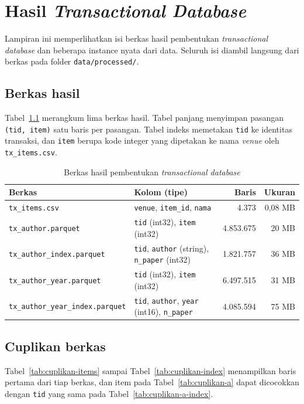 \chapter{Hasil \textit{Transactional Database}}
\label{lamp:transaksi}

Lampiran ini memperlihatkan isi berkas hasil pembentukan \textit{transactional database} dan beberapa instance nyata dari data. Seluruh isi diambil langsung dari berkas pada folder \texttt{data/processed/}.

\section{Berkas hasil}
Tabel~\ref{tab:berkas-tx} merangkum lima berkas hasil. Tabel panjang menyimpan pasangan \texttt{(tid, item)} satu baris per pasangan. Tabel indeks memetakan \texttt{tid} ke identitas transaksi, dan \texttt{item} berupa kode integer yang dipetakan ke nama \textit{venue} oleh \texttt{tx\_items.csv}.

\begin{table}[!htb]
\caption{Berkas hasil pembentukan \textit{transactional database}}
\label{tab:berkas-tx}
\scriptsize
\begin{tabularx}{\textwidth}{@{}p{5.0cm}>{\raggedright\arraybackslash}Xrr@{}}
\toprule
\textbf{Berkas} & \textbf{Kolom (tipe)} & \textbf{Baris} & \textbf{Ukuran} \\
\midrule
\texttt{tx\_items.csv} & \texttt{venue}, \texttt{item\_id}, \texttt{nama} & 4.373 & 0,08 MB \\
\texttt{tx\_author.parquet} & \texttt{tid} (int32), \texttt{item} (int32) & 4.853.675 & 20 MB \\
\texttt{tx\_author\_index.parquet} & \texttt{tid}, \texttt{author} (string), \texttt{n\_paper} (int32) & 1.821.757 & 36 MB \\
\texttt{tx\_author\_year.parquet} & \texttt{tid} (int32), \texttt{item} (int32) & 6.497.515 & 31 MB \\
\texttt{tx\_author\_year\_index.parquet} & \texttt{tid}, \texttt{author}, \texttt{year} (int16), \texttt{n\_paper} & 4.085.594 & 75 MB \\
\bottomrule
\end{tabularx}
\end{table}

\section{Cuplikan berkas}
Tabel~\ref{tab:cuplikan-items} sampai Tabel~\ref{tab:cuplikan-index} menampilkan baris pertama dari tiap berkas, dan item pada Tabel~\ref{tab:cuplikan-a} dapat dicocokkan dengan \texttt{tid} yang sama pada Tabel~\ref{tab:cuplikan-a-index}.

